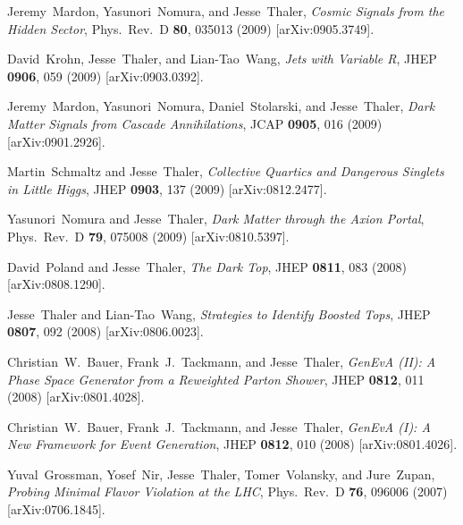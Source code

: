 \documentclass[11pt]{article}
\renewcommand{\bibitem}[1]{\item}
\begin{document}
\begin{list}{[]\addtocounter{jessecount}{-1}}{\leftmargin=3em \itemsep=4pt}
\bibitem{Mardon:2009gw}
  Jeremy~Mardon, Yasunori~Nomura, and Jesse~Thaler,
  \emph{Cosmic Signals from the Hidden Sector},
  Phys.\ Rev.\  D {\bf 80}, 035013 (2009)
  [arXiv:0905.3749].
  
\bibitem{Krohn:2009zg}
  David~Krohn, Jesse~Thaler, and Lian-Tao~Wang,
  \emph{Jets with Variable R},
  JHEP {\bf 0906}, 059 (2009)
  [arXiv:0903.0392].
  
\bibitem{Mardon:2009rc}
  Jeremy~Mardon, Yasunori~Nomura, Daniel~Stolarski, and Jesse~Thaler,
  \emph{Dark Matter Signals from Cascade Annihilations},
  JCAP {\bf 0905}, 016 (2009)
  [arXiv:0901.2926].
  
\bibitem{Schmaltz:2008vd}
  Martin~Schmaltz and Jesse~Thaler,
  \emph{Collective Quartics and Dangerous Singlets in Little Higgs},
  JHEP {\bf 0903}, 137 (2009)
  [arXiv:0812.2477].
  
\bibitem{Nomura:2008ru}
  Yasunori~Nomura and Jesse~Thaler,
  \emph{Dark Matter through the Axion Portal},
  Phys.\ Rev.\  D {\bf 79}, 075008 (2009)
  [arXiv:0810.5397].
  
\bibitem{Poland:2008ev}
  David~Poland and Jesse~Thaler,
  \emph{The Dark Top},
  JHEP {\bf 0811}, 083 (2008)
  [arXiv:0808.1290].
  
\bibitem{Thaler:2008ju}
  Jesse~Thaler and Lian-Tao~Wang,
  \emph{Strategies to Identify Boosted Tops},
  JHEP {\bf 0807}, 092 (2008)
  [arXiv:0806.0023].
  
\bibitem{Bauer:2008qj}
  Christian~W.~Bauer, Frank~J.~Tackmann, and Jesse~Thaler,
  \emph{GenEvA (II): A Phase Space Generator from a Reweighted Parton Shower},
  JHEP {\bf 0812}, 011 (2008)
  [arXiv:0801.4028].
  
\bibitem{Bauer:2008qh}
  Christian~W.~Bauer, Frank~J.~Tackmann, and Jesse~Thaler,
  \emph{GenEvA (I): A New Framework for Event Generation},
  JHEP {\bf 0812}, 010 (2008)
  [arXiv:0801.4026].
  
\bibitem{Grossman:2007bd}
  Yuval~Grossman, Yosef~Nir, Jesse~Thaler, Tomer~Volansky, and Jure~Zupan,
  \emph{Probing Minimal Flavor Violation at the LHC},
  Phys.\ Rev.\  D {\bf 76}, 096006 (2007)
  [arXiv:0706.1845].
  

\end{list}
\end{document}
